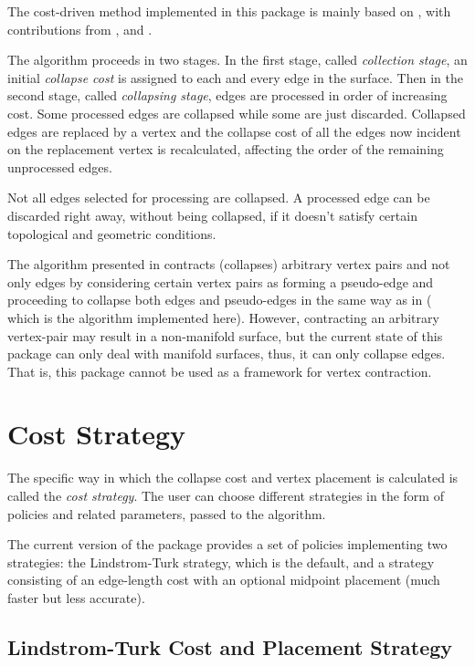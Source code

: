 The cost-driven method implemented in this package is mainly based on \cite{cgal:lt-fmeps-98,cgal:lt-ems-99}, with contributions from \cite{hddms-mo-93}, \cite{gh-ssqem-97}
and \cite{degn-tpec-98}.

The algorithm proceeds in two stages. In the first stage, called {\em collection stage}, 
an initial {\em collapse cost} is assigned to each and every edge in the surface.
Then in the second stage, called {\em collapsing stage}, edges are 
processed in order of increasing cost. Some processed edges are collapsed 
while some are just discarded. Collapsed edges are replaced by a vertex and the collapse 
cost of all the edges now incident on the replacement vertex is recalculated, affecting 
the order of the remaining unprocessed edges.

Not all edges selected for processing are collapsed. A processed edge can be discarded 
right away, without being collapsed, if it doesn't satisfy certain topological
and geometric conditions.

The algorithm presented in \cite{gh-ssqem-97} contracts (collapses) arbitrary vertex pairs and not 
only edges by considering certain vertex pairs as forming a pseudo-edge and proceeding to collapse
both edges and pseudo-edges in the same way as in \cite{cgal:lt-fmeps-98,cgal:lt-ems-99} ( 
which is the algorithm implemented here). However, contracting an arbitrary vertex-pair may result in a non-manifold surface, but the current state of this package can only deal with manifold surfaces, thus, it can only collapse edges. That is, this package cannot be used as a framework for vertex contraction.

\section{Cost Strategy}

The specific way in which the collapse cost and vertex placement is
calculated is called the {\em cost strategy}. The user can choose 
different strategies in the form of policies and related parameters,
passed to the algorithm.
 
The current version of the package provides a set of policies implementing
two strategies: the Lindstrom-Turk strategy, which is the default, and 
a strategy consisting of an edge-length cost with an optional
midpoint placement (much faster but less accurate).

\subsection{Lindstrom-Turk Cost and Placement Strategy\label{SurfaceMeshSimplification:LindstromTurkStrategy}}

